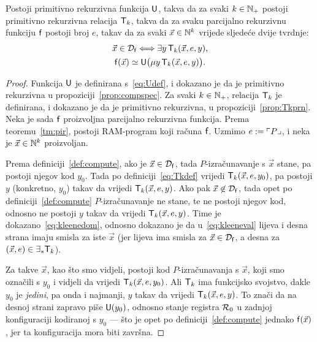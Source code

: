 \begin{teorem}
Postoji primitivno rekurzivna funkcija $\mathsf U$, takva da za svaki $k\in{\mathbb N}_+$ postoji primitivno rekurzivna relacija $\mathsf T_k$, takva da za svaku parcijalno rekurzivnu funkciju $\mathsf f$ postoji broj $e$, takav da za svaki $\vec x\in{\mathbb N}^k$ vrijede sljedeće dvije tvrdnje:
\begin{gather}
    \label{eq:kleenedom}\vec x\in\mathcal D_{\mathsf f}\Longleftrightarrow\exists y\,\mathsf T_k(\vec x,e,y)\text,\\
    \label{eq:kleeneval}\mathsf f(\vec x)\simeq\mathsf U\bigl(\mu y\,\mathsf T_k(\vec x,e,y)\bigr)\text.
\end{gather}
\end{teorem}
\begin{proof}
Funkcija $\mathsf U$ je definirana s~\eqref{eq:Udef}, i dokazano je da je primitivno rekurzivna u propoziciji~\ref{prop:compspec}. Za svaki $k\in{\mathbb N}_+$, relacija $\mathsf T_k$ je definirana, i dokazano je da je primitivno rekurzivna, u propoziciji~\ref{prop:Tkprn}. Neka je sada $\mathsf f$ proizvoljna parcijalno rekurzivna funkcija. Prema teoremu~\ref{tm:pir}, postoji RAM-program koji računa $\mathsf f$. Uzmimo $e:=\ulcorner P\lrcorner$, i neka je $\vec x\in{\mathbb N}^k$ proizvoljan.

Prema definiciji~\ref{def:compute}, ako je $\vec x\in\mathcal D_{\mathsf f}$, tada $P$-izračunavanje s $\vec x$ stane, pa postoji njegov kod $y_0$. Tada po definiciji~\eqref{eq:Tkdef} vrijedi $\mathsf T_k(\vec x,e,y_0)$, pa postoji $y$ (konkretno, $y_0$) takav da vrijedi $\mathsf T_k(\vec x,e,y)$. Ako pak $\vec x\not\in\mathcal D_{\mathsf f}$, tada opet po definiciji~\ref{def:compute} $P$-izračunavanje ne stane, te ne postoji njegov kod, odnosno ne postoji $y$ takav da vrijedi $\mathsf T_k(\vec x,e,y)$. Time je dokazano~\eqref{eq:kleenedom}, odnosno dokazano je da u~\eqref{eq:kleeneval} lijeva i desna strana imaju smisla za iste $\vec x$ (jer lijeva ima smisla za $\vec x\in\mathcal D_{\mathsf f}$, a desna za $(\vec x,e)\in\exists_*\mathsf T_k$).

Za takve $\vec x$, kao što smo vidjeli, postoji kod $P$-izračunavanja s $\vec x$, koji smo označili s $y_0$ i vidjeli da vrijedi $\mathsf T_k(\vec x,e,y_0)$. Ali $\mathsf T_k$ ima funkcijsko svojstvo, dakle $y_0$ je \emph{jedini}, pa onda i najmanji, $y$ takav da vrijedi $\mathsf T_k(\vec x,e,y)$. To znači da na desnoj strani zapravo piše $\mathsf U(y_0)$, odnosno stanje registra $\mathcal R_{0}$ u zadnjoj konfiguraciji kodiranoj s $y_0$ --- što je opet po definiciji~\ref{def:compute} jednako $\mathsf f(\vec x)$, jer ta konfiguracija mora biti završna.
\end{proof}

